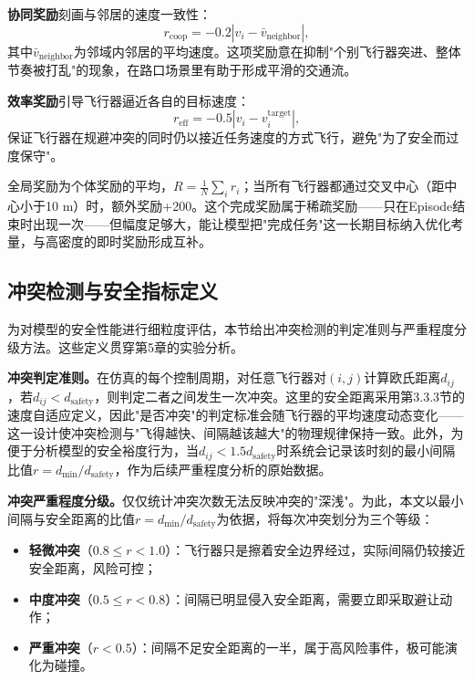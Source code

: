 \documentclass[12pt,a4paper,UTF8]{ctexart}
\begin{document}
\textbf{协同奖励}刻画与邻居的速度一致性：
\begin{equation}
    r_{\text{coop}} = -0.2\left|v_i - \bar{v}_{\text{neighbor}}\right|,
    \label{eq:reward_coop}
\end{equation}
其中$\bar{v}_{\text{neighbor}}$为邻域内邻居的平均速度。这项奖励意在抑制"个别飞行器突进、整体节奏被打乱"的现象，在路口场景里有助于形成平滑的交通流。

\textbf{效率奖励}引导飞行器逼近各自的目标速度：
\begin{equation}
    r_{\text{eff}} = -0.5\left|v_i - v_i^{\text{target}}\right|,
    \label{eq:reward_eff}
\end{equation}
保证飞行器在规避冲突的同时仍以接近任务速度的方式飞行，避免"为了安全而过度保守"。

全局奖励为个体奖励的平均，$R=\frac{1}{N}\sum_i r_i$；当所有飞行器都通过交叉中心（距中心小于10 m）时，额外奖励+200。这个完成奖励属于稀疏奖励——只在Episode结束时出现一次——但幅度足够大，能让模型把"完成任务"这一长期目标纳入优化考量，与高密度的即时奖励形成互补。

\subsection{冲突检测与安全指标定义}

为对模型的安全性能进行细粒度评估，本节给出冲突检测的判定准则与严重程度分级方法。这些定义贯穿第5章的实验分析。

\textbf{冲突判定准则。}在仿真的每个控制周期，对任意飞行器对$(i,j)$计算欧氏距离$d_{ij}$，若$d_{ij}<d_{\text{safety}}$，则判定二者之间发生一次冲突。这里的安全距离采用第3.3.3节的速度自适应定义，因此"是否冲突"的判定标准会随飞行器的平均速度动态变化——这一设计使冲突检测与"飞得越快、间隔越该越大"的物理规律保持一致。此外，为便于分析模型的安全裕度行为，当$d_{ij}<1.5d_{\text{safety}}$时系统会记录该时刻的最小间隔比值$r=d_{\min}/d_{\text{safety}}$，作为后续严重程度分析的原始数据。

\textbf{冲突严重程度分级。}仅仅统计冲突次数无法反映冲突的"深浅"。为此，本文以最小间隔与安全距离的比值$r=d_{\min}/d_{\text{safety}}$为依据，将每次冲突划分为三个等级：
\begin{itemize}
    \item \textbf{轻微冲突}（$0.8\leq r<1.0$）：飞行器只是擦着安全边界经过，实际间隔仍较接近安全距离，风险可控；
    \item \textbf{中度冲突}（$0.5\leq r<0.8$）：间隔已明显侵入安全距离，需要立即采取避让动作；
    \item \textbf{严重冲突}（$r<0.5$）：间隔不足安全距离的一半，属于高风险事件，极可能演化为碰撞。
\end{itemize}
\end{document}
